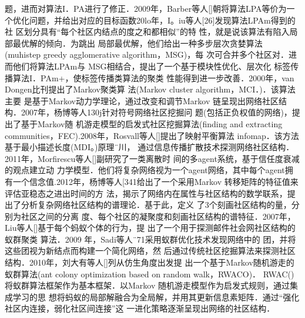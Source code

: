 题，进而对算法I．PA进行了修正．2009年，Barber等人[]朝将算法LPA等价为一
个优化问题，并给出对应的目标函数20lo年，I。iu等人[26]发现算法LPAm得到的社
区划分具有“每个社区内结点的度之和都相似”的特
性，就是说该算法有陷入局部最优解的倾向．为跳出
局部最优解，他们给出一种多步层次贪婪算法
(muhistep greedy agglomerative algorithm，MSG)，每
次可合并多个社区对．进而他们将算法LPAm与
MSG相结合，提出了一个基于模块性优化、层次化
标签传播算法I．PAm+，使标签传播类算法的聚类
性能得到进一步改善．2000年，van Dongen比刊提出了Markov聚类算
法(Markov cluster algorithm，MCI．)．该算法主要
是基于Markov动力学理论，通过改变和调节Markov
链呈现出网络社区结构．2007年，杨博等人130j针对符号网络社区挖掘问
题(包括正负权值的网络)，提出了基于Markov随
机游走模型的启发式社区挖掘算法(finding and
extracting communities，FEC).2008年，Rosvall等人[]提出了映射平衡算法
infomap．该方法基于最小描述长度(MDI。)原理¨川，
通过信息传播扩散技术探测网络社区结构．2011年，Morfirescu等人[]副研究了一类离散时
间的多agent系统，基于信任度衰减的观点建立动
力学模型．他们将复杂网络视为一个agent网络，其中每个agent拥有一个信念值.2012年，杨博等人[341给出了一个采用Markov
转移矩阵的特征值来评估亚稳态之进出时间的方
法，揭示了网络内在属性与社区结构的数学联系，提
出了分析复杂网络社区结构的谱理论．基于此，定义
了3个刻画社区结构的量，分别为社区之间的分离
度、每个社区的凝聚度和刻画社区结构的谱特征．2007年，Liu等人[]基于每个蚂蚁个体的行为，提
出了一个用于探测邮件社会网社区结构的蚁群聚类
算法．2009
年，Sadi等人¨71采用蚁群优化技术发现网络中的
团，并将这些团视为新结点而构建一个简化网络，然
后通过传统社区挖掘算法来探测社区结构．2010年，刘大有等人[]列从仿生角度出发提
出一个基于Markov随机游走的蚁群算法(ant colony
optimization based on random walk，RWACO)．
RWAC()将蚁群算法框架作为基本框架．以Markov
随机游走模型作为启发式规则，通过集成学习的思
想将蚂蚁的局部解融合为全局解，并用其更新信息素矩阵．通过“强化社区内连接，弱化社区间连接”这
一进化策略逐渐呈现出网络的社区结构．
